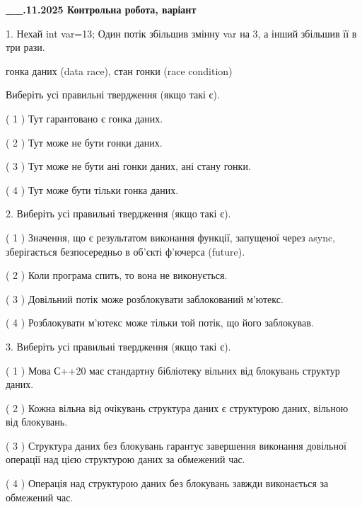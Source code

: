 \documentclass[12pt, ukrainian]{article}
\begin{document}
\newpage
\begin {large}

\textbf{\_\_.11.2025 Контрольна робота, варіант  }\par


{
1. Нехай int var=13; Один потік збільшив змінну var на 3, а інший збільшив її в три рази.

гонка даних (data race), стан гонки (race condition)

Виберіть усі правильні твердження (якщо такі є).\par
\vspace{2mm}
( 1 ) Тут гарантовано є гонка даних.%

( 2 ) Тут може не бути гонки даних.%

( 3 ) Тут може не бути ані гонки даних, ані стану гонки.%

( 4 ) Тут може бути тільки гонка даних.%


2. Виберіть усі правильні твердження (якщо такі є).\par
\vspace{2mm}

( 1 ) Значення, що є результатом виконання функції, запущеної через async, зберігається безпосередньо в об’єкті ф’ючерса (future).%

( 2 ) Коли програма спить, то вона не виконується.%

( 3 ) Довільний потік може розблокувати заблокований м’ютекс.%

( 4 ) Розблокувати м’ютекс може тільки той потік, що його заблокував.%


3. Виберіть усі правильні твердження (якщо такі є).\par
\vspace{2mm}

( 1 ) Мова С++20 має стандартну бібліотеку вільних від блокувань структур даних.%

( 2 ) Кожна вільна від очікувань структура даних є структурою даних, вільною від блокувань.%

( 3 ) Структура даних без блокувань гарантує завершення виконання довільної операції над цією структурою даних за обмежений час.%

( 4 ) Операція над структурою даних без блокувань завжди виконається за обмежений час.%


}
\end{large}
\end{document}
